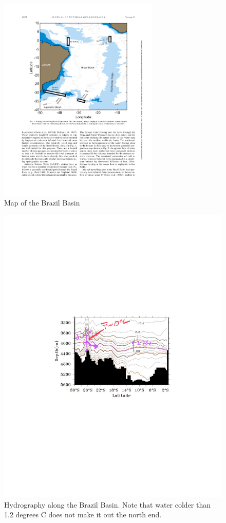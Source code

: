 \begin{figure}[hbt]
  \begin{center}
    \includegraphics[width=3in]{figs/WaterMasses/MorrisEtAl01Fig1}
    \caption{Map of the Brazil Basin \citep{morrisetal01}}
    \label{fig:MorrisEtAl01Fig1}  
  \end{center}
\end{figure}
\begin{figure}[hbt]
  \begin{center}
    \includegraphics{figs/WaterMasses/MorrisEtAl01Fig4Ann}
    \caption{Hydrography along the Brazil Basin.  Note that water colder than 1.2 degrees C does not make it out the north end.   \citep{morrisetal01}}
    \label{fig:MorrisEtAl01Fig4}  
  \end{center}
\end{figure}

